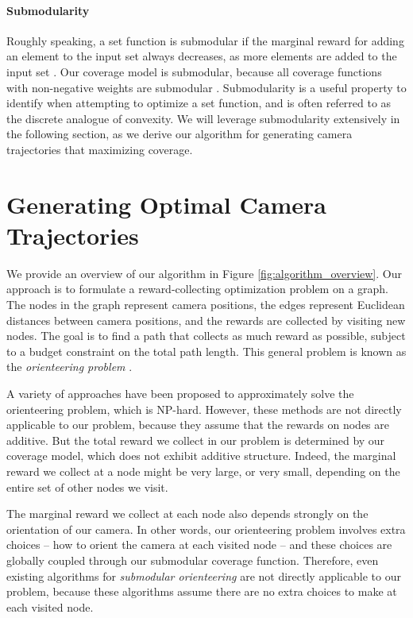 \vspace{-10pt}
\paragraph{Submodularity}
Roughly speaking, a set function is submodular if the marginal reward for adding an element to the input set always decreases, as more elements are added to the input set \cite{krause:2014}.
Our coverage model is submodular, because all coverage functions with non-negative weights are submodular \cite{krause:2014}.
Submodularity is a useful property to identify when attempting to optimize a set function, and is often referred to as the discrete analogue of convexity.
We will leverage submodularity extensively in the following section, as we derive our algorithm for generating camera trajectories that maximizing coverage. 

\vspace{-5pt}
\section{Generating Optimal Camera Trajectories}
\label{sec:trajectories}
We provide an overview of our algorithm in Figure \ref{fig:algorithm_overview}.
Our approach is to formulate a reward-collecting optimization problem on a graph.
The nodes in the graph represent camera positions, the edges represent Euclidean distances between camera positions, and the rewards are collected by visiting new nodes.
The goal is to find a path that collects as much reward as possible, subject to a budget constraint on the total path length.
This general problem is known as the \emph{orienteering problem} \cite{gunawan:2016,vansteenwegena:2011}.

A variety of approaches have been proposed to approximately solve the orienteering problem, which is NP-hard.
However, these methods are not directly applicable to our problem, because they assume that the rewards on nodes are additive.
But the total reward we collect in our problem is determined by our coverage model, which does not exhibit additive structure.
Indeed, the marginal reward we collect at a node might be very large, or very small, depending on the entire set of other nodes we visit.


The marginal reward we collect at each node also depends strongly on the orientation of our camera. In other words, our orienteering problem involves extra choices -- how to orient the camera at each visited node -- and these choices are globally coupled through our submodular coverage function. Therefore, even existing algorithms for \emph{submodular orienteering} \cite{chekuri:2012,chekuri:2005,heng:2015,singh:2009a,singh:2009b,zhang:2016} are not directly applicable to our problem, because these algorithms assume there are no extra choices to make at each visited node.

